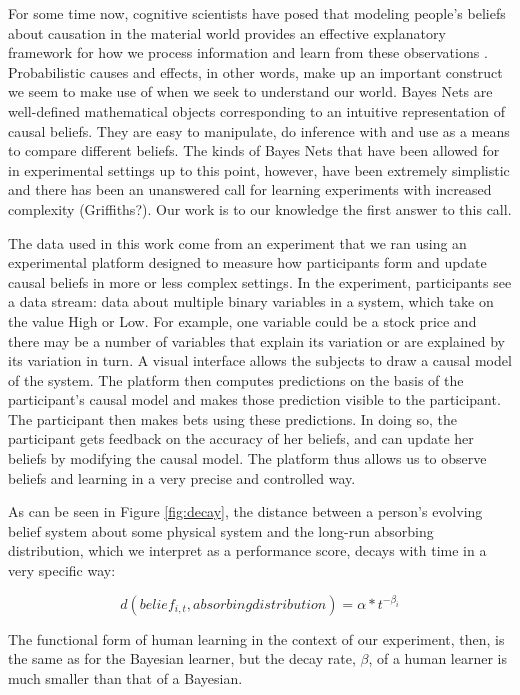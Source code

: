For some time now, cognitive scientists have posed that modeling people's beliefs about causation in the material world provides an effective explanatory framework for how we process information and learn from these observations \cite{Griffiths2008}.  Probabilistic causes and effects, in other words, make up an important construct we seem to make use of when we seek to understand our world.  Bayes Nets are well-defined mathematical objects corresponding to an intuitive representation of causal beliefs.  They are easy to manipulate, do inference with and use as a means to compare different beliefs.  The kinds of Bayes Nets that have been allowed for in experimental settings up to this point, however, have been extremely simplistic and there has been an unanswered call for learning experiments with increased complexity (Griffiths?).  Our work is to our knowledge the first answer to this call.  

The data used in this work come from an experiment that we ran using an experimental platform designed to measure how participants form and update causal beliefs in more or less complex settings.  In the experiment, participants see a data stream: data about multiple binary variables in a system, which take on the value High or Low. For example, one variable could be a stock price and there may be a number of variables that explain its variation or are explained by its variation in turn.  A visual interface allows the subjects to draw a causal model of the system. The platform then computes predictions on the basis of the participant's causal model and makes those prediction visible to the participant. The participant then makes bets using these predictions. In doing so, the participant gets feedback on the accuracy of her beliefs, and can update her beliefs by modifying the causal model. The platform thus allows us to observe beliefs and learning in a very precise and controlled way.

As can be seen in Figure \ref{fig:decay}, the distance between a person's evolving belief system about some physical system and the long-run absorbing distribution, which we interpret as a performance score, decays with time in a very specific way:

\begin{equation}
\label{ }
d(belief_{i, t}, absorbing distribution) = \alpha*t^{-\beta_i}
\end{equation}



The functional form of human learning in the context of our experiment, then, is the same as for the Bayesian learner, but the decay rate, $\beta$, of a human learner is much smaller than that of a Bayesian. 


